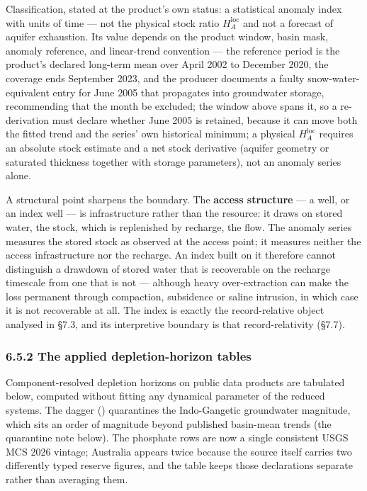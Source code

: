 \documentclass[11pt]{article}
\begin{document}
Classification, stated at the product's own status: a statistical anomaly index with units of time --- not the physical stock ratio \(H_A^{\mathrm{loc}}\) and not a forecast of aquifer exhaustion. Its value depends on the product window, basin mask, anomaly reference, and linear-trend convention --- the reference period is the product's declared long-term mean over April 2002 to December 2020, the coverage ends September 2023, and the producer documents a faulty snow-water-equivalent entry for June 2005 that propagates into groundwater storage, recommending that the month be excluded; the window above spans it, so a re-derivation must declare whether June 2005 is retained, because it can move both the fitted trend and the series' own historical minimum; a physical \(H_A^{\mathrm{loc}}\) requires an absolute stock estimate and a net stock derivative (aquifer geometry or saturated thickness together with storage parameters), not an anomaly series alone.

A structural point sharpens the boundary. The \textbf{access structure} --- a well, or an index well --- is infrastructure rather than the resource: it draws on stored water, the stock, which is replenished by recharge, the flow. The anomaly series measures the stored stock as observed at the access point; it measures neither the access infrastructure nor the recharge. An index built on it therefore cannot distinguish a drawdown of stored water that is recoverable on the recharge timescale from one that is not --- although heavy over-extraction can make the loss permanent through compaction, subsidence or saline intrusion, in which case it is not recoverable at all. The index is exactly the record-relative object analysed in \S7.3, and its interpretive boundary is that record-relativity (\S7.7).

\subsubsection*{6.5.2 The applied depletion-horizon tables}\label{652-the-applied-depletion-horizon-tables}

Component-resolved depletion horizons on public data products are tabulated below, computed without fitting any dynamical parameter of the reduced systems. The dagger (\dag{}) quarantines the Indo-Gangetic groundwater magnitude, which sits an order of magnitude beyond published basin-mean trends (the quarantine note below). The phosphate rows are now a single consistent USGS MCS 2026 vintage; Australia appears twice because the source itself carries two differently typed reserve figures, and the table keeps those declarations separate rather than averaging them.
\end{document}
